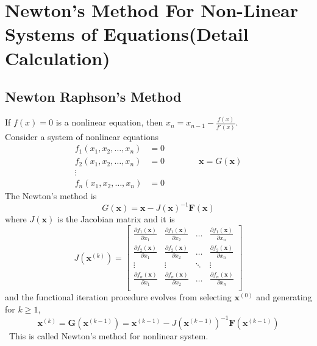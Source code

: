 \documentclass[../main-sheet.tex]{subfiles}
\begin{document}
\chapter{Newton's Method For Non-Linear Systems of Equations(Detail Calculation)}
\section{Newton Raphson's Method}
If \(f(x)=0\) is a nonlinear equation, then \(x_n=x_{n-1}-\frac{f(x)}{f'(x)}\).\\
Consider a system of nonlinear equations
\begin{align*}
            f_1(x_1,x_2,\dots, x_n)&=0\\
        f_2(x_1,x_2,\dots, x_n)&=0\qquad\qquad \mathbf{x}=G(\mathbf{x})\\
        \vdots\qquad\quad& \\
        f_n(x_1,x_2,\dots, x_n)&=0
\end{align*}
The Newton's method is
\[
    {G}\left( \mathbf{x}\right)=\mathbf{x}-J\left( \mathbf{x} \right)^{-1}\mathbf{F}\left( \mathbf{x} \right)
\]
where \(J(\mathbf{x})\) is the Jacobian matrix and it is
\[
    J(\mathbf{x}^{(k)})=\begin{bmatrix}
        \frac{\partial f_1(\mathbf{x})}{\partial x_1} & \frac{\partial f_1(\mathbf{x})}{\partial x_2} &\dots&\frac{\partial f_1(\mathbf{x})}{\partial x_n} \\[1em]
        \frac{\partial f_2(\mathbf{x})}{\partial x_1} & \frac{\partial f_2(\mathbf{x})}{\partial x_2} &\dots&\frac{\partial f_2(\mathbf{x})}{\partial x_n} \\[1em]
        \vdots & \vdots & \ddots & \vdots\\
        \frac{\partial f_n(\mathbf{x})}{\partial x_1} & \frac{\partial f_n(\mathbf{x})}{\partial x_2} &\dots&\frac{\partial f_n(\mathbf{x})}{\partial x_n} \\
    \end{bmatrix}
\]
and the functional iteration procedure evolves from selecting \(\mathbf{x}^{(0)}\) and generating for \(k\geq 1\),
\[
    \mathbf{x}^{(k)}=\mathbf{G}\left( \mathbf{x}^{(k-1)} \right)=\mathbf{x}^{(k-1)}-J\left( \mathbf{x}^{(k-1)} \right)^{-1}\mathbf{F}\left( \mathbf{x}^{(k-1)} \right)
\]\
This is called Newton's method for nonlinear system.
\end{document}
